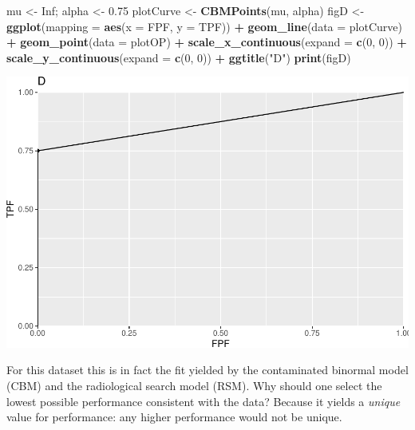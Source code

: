 \documentclass[
]{book}
\newenvironment{Shaded}{\begin{snugshade}}{\end{snugshade}}
\newcommand{\DataTypeTok}[1]{\textcolor[rgb]{0.13,0.29,0.53}{#1}}
\newcommand{\DecValTok}[1]{\textcolor[rgb]{0.00,0.00,0.81}{#1}}
\newcommand{\FloatTok}[1]{\textcolor[rgb]{0.00,0.00,0.81}{#1}}
\newcommand{\KeywordTok}[1]{\textcolor[rgb]{0.13,0.29,0.53}{\textbf{#1}}}
\newcommand{\NormalTok}[1]{#1}
\newcommand{\OperatorTok}[1]{\textcolor[rgb]{0.81,0.36,0.00}{\textbf{#1}}}
\newcommand{\OtherTok}[1]{\textcolor[rgb]{0.56,0.35,0.01}{#1}}
\newcommand{\StringTok}[1]{\textcolor[rgb]{0.31,0.60,0.02}{#1}}
\begin{document}
\begin{Shaded}
\begin{Highlighting}[]
\NormalTok{mu \textless{}{-}}\StringTok{ }\OtherTok{Inf}\NormalTok{; alpha \textless{}{-}}\StringTok{ }\FloatTok{0.75}
\NormalTok{plotCurve \textless{}{-}}\StringTok{ }\KeywordTok{CBMPoints}\NormalTok{(mu, alpha)}
\NormalTok{figD \textless{}{-}}\StringTok{ }\KeywordTok{ggplot}\NormalTok{(}\DataTypeTok{mapping =} \KeywordTok{aes}\NormalTok{(}\DataTypeTok{x =}\NormalTok{ FPF, }\DataTypeTok{y =}\NormalTok{ TPF)) }\OperatorTok{+}\StringTok{ }
\StringTok{  }\KeywordTok{geom\_line}\NormalTok{(}\DataTypeTok{data =}\NormalTok{ plotCurve) }\OperatorTok{+}\StringTok{ }
\StringTok{  }\KeywordTok{geom\_point}\NormalTok{(}\DataTypeTok{data =}\NormalTok{ plotOP)  }\OperatorTok{+}\StringTok{ }
\StringTok{  }\KeywordTok{scale\_x\_continuous}\NormalTok{(}\DataTypeTok{expand =} \KeywordTok{c}\NormalTok{(}\DecValTok{0}\NormalTok{, }\DecValTok{0}\NormalTok{)) }\OperatorTok{+}\StringTok{ }
\StringTok{  }\KeywordTok{scale\_y\_continuous}\NormalTok{(}\DataTypeTok{expand =} \KeywordTok{c}\NormalTok{(}\DecValTok{0}\NormalTok{, }\DecValTok{0}\NormalTok{)) }\OperatorTok{+}
\StringTok{  }\KeywordTok{ggtitle}\NormalTok{(}\StringTok{"D"}\NormalTok{)}
\KeywordTok{print}\NormalTok{(figD)}
\end{Highlighting}
\end{Shaded}

\begin{center}\includegraphics{22-DegenerateROCs_files/figure-latex/unnamed-chunk-4-1} \end{center}

For this dataset this is in fact the fit yielded by the contaminated binormal model (CBM) and the radiological search model (RSM). Why should one select the lowest possible performance consistent with the data? Because it yields a \emph{unique} value for performance: any higher performance would not be unique.
\end{document}
